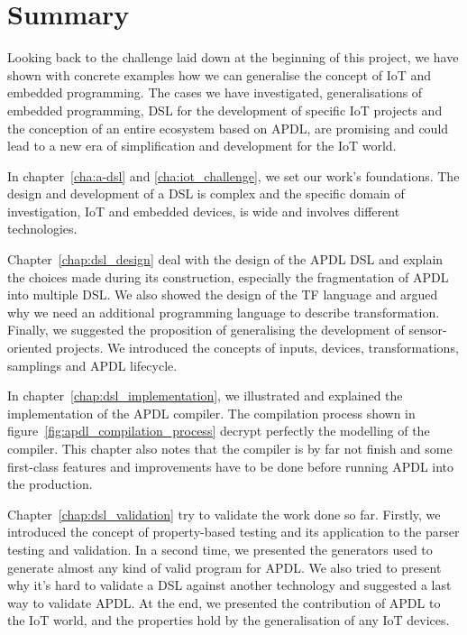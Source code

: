 
\section{Summary}
\label{sec:summary}

Looking back to the challenge laid down at the beginning of this project, we
have shown with concrete examples how we can generalise the concept of
\gls{IoT} and embedded programming. The cases we have investigated,
generalisations of embedded programming, \gls{DSL} for the development of
specific \gls{IoT} projects and the conception of an entire ecosystem based on
\gls{APDL}, are promising and could lead to a new era of simplification and
development for the \gls{IoT} world.

In chapter~\ref{cha:a-dsl} and \ref{cha:iot_challenge}, we set our work's
foundations. The design and development of a \gls{DSL} is complex and the
specific domain of investigation, \gls{IoT} and embedded devices, is wide and involves different technologies.

Chapter~\ref{chap:dsl_design} deal with the design of the APDL \gls{DSL} and
explain the choices made during its construction, especially the fragmentation of
APDL into multiple DSL. We also showed the design of the \gls{TF} language and
argued why we need an additional programming language to describe
transformation. Finally, we suggested the proposition of generalising the
development of sensor-oriented projects. We introduced the concepts of inputs,
devices, transformations, samplings and APDL lifecycle.

In chapter~\ref{chap:dsl_implementation}, we illustrated and explained the
implementation of the APDL compiler. The compilation process shown in
figure~\ref{fig:apdl_compilation_process} decrypt perfectly the modelling of
the compiler. This chapter also notes that the compiler is by far not finish and
some first-class features and improvements have to be done before running APDL
into the production.

Chapter~\ref{chap:dsl_validation} try to validate the work done so far. Firstly,
we introduced the concept of property-based testing and its application to
the parser testing and validation. In a second time, we presented the generators used
to generate almost any kind of valid program for APDL. We also tried to present
why it's hard to validate a \gls{DSL} against another technology and suggested a
last way to validate APDL. At the end, we presented the contribution of APDL to
the \gls{IoT} world, and the properties hold by the generalisation of any
\gls{IoT} devices.

